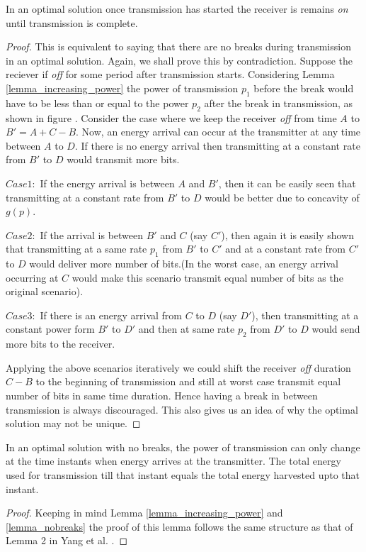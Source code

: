 \begin{lemma}
In an optimal solution once transmission has started the receiver is remains \textit{on} until transmission is complete. \label{lemma_nobreaks}
\end{lemma}
\begin{proof}
This is equivalent to saying that there are no breaks during transmission in an optimal solution. Again, we shall prove this by contradiction. Suppose the reciever if \textit{off} for some period after transmission starts. Considering Lemma \ref{lemma_increasing_power} the power of transmission $p_1$ before the break would have to be less than or equal to the power $p_2$ after the break in transmission, as shown in figure . Consider the case where we keep the receiver \textit{off} from time $A$ to $B'=A+C-B$. Now, an energy arrival can occur at the transmitter at any time between $A$ to $D$. If there is no energy arrival then transmitting at a constant rate from $B'$ to $D$ would transmit more bits.

$Case 1:$ If the energy arrival is between $A$ and $B'$, then it can be easily seen that transmitting at a constant rate from $B'$ to $D$ would be better due to concavity of $g(p)$.

$Case 2:$ If the arrival is between $B'$ and $C$ (say $C'$), then again it is easily shown that transmitting at a same rate $p_1$ from $B'$ to $C'$ and  at a constant rate from $C'$ to $D$ would deliver more number of bits.(In the worst case, an energy arrival occurring at $C$ would make this scenario transmit equal number of bits as the original scenario).

$Case 3:$ If there is an energy arrival from $C$ to $D$ (say $D'$), then transmitting at a constant power form $B'$ to $D'$ and then at same rate $p_2$ from $D'$ to $D$ would send more bits to the receiver.

Applying the above scenarios iteratively we could shift the receiver \textit{off} duration $C-B$ to the beginning of transmission and still at worst case transmit equal number of bits in same time duration. Hence having a break in between transmission is always discouraged. This also gives us an idea of why the optimal solution may not be unique.
\end{proof}

\begin{lemma}
In an optimal solution with no breaks, the power of transmission can only change at the time instants when energy arrives at the transmitter. The total energy used for transmission till that instant equals the total energy harvested upto that instant.
\label{lemma_energy_consumed} 
\end{lemma}
\begin{proof}
Keeping in mind Lemma \ref{lemma_increasing_power} and \ref{lemma_nobreaks} the proof of this lemma follows the same structure as that of Lemma 2 in Yang et al. \cite{Yang}. 
\end{proof}	
